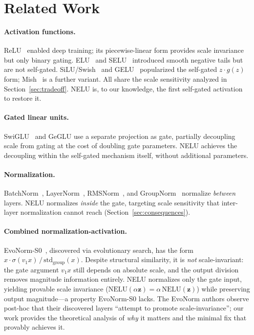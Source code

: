 \section{Related Work}\label{sec:related}

\paragraph{Activation functions.}
ReLU~\citep{nair2010rectified} enabled deep training; its piecewise-linear form provides scale invariance but only binary gating.
ELU~\citep{clevert2016fast} and SELU~\citep{klambauer2017self} introduced smooth negative tails but are not self-gated.
SiLU/Swish~\citep{elfwing2018sigmoid,ramachandran2017searching} and GELU~\citep{hendrycks2016gaussian} popularized the self-gated $z \cdot g(z)$ form; Mish~\citep{misra2019mish} is a further variant.
All share the scale sensitivity analyzed in Section~\ref{sec:tradeoff}.
NELU is, to our knowledge, the first self-gated activation to restore it.

\paragraph{Gated linear units.}
SwiGLU~\citep{shazeer2020glu} and GeGLU use a separate projection as gate, partially decoupling scale from gating at the cost of doubling gate parameters.
NELU achieves the decoupling within the self-gated mechanism itself, without additional parameters.

\paragraph{Normalization.}
BatchNorm~\citep{ioffe2015batch}, LayerNorm~\citep{ba2016layer}, RMSNorm~\citep{zhang2019root}, and GroupNorm~\citep{wu2018group} normalize \emph{between} layers.
NELU normalizes \emph{inside} the gate, targeting scale sensitivity that inter-layer normalization cannot reach (Section~\ref{sec:consequences}).

\paragraph{Combined normalization-activation.}
EvoNorm-S0~\citep{liu2020evolving}, discovered via evolutionary search, has the form $x \cdot \sigma(v_1 x)\,/\,\mathrm{std}_{\mathrm{group}}(x)$.
Despite structural similarity, it is \emph{not} scale-invariant: the gate argument $v_1 x$ still depends on absolute scale, and the output division removes magnitude information entirely.
NELU normalizes only the gate input, yielding provable scale invariance ($\mathrm{NELU}(\alpha\mathbf{z}) = \alpha\,\mathrm{NELU}(\mathbf{z})$) while preserving output magnitude---a property EvoNorm-S0 lacks.
The EvoNorm authors observe post-hoc that their discovered layers ``attempt to promote scale-invariance''; our work provides the theoretical analysis of \emph{why} it matters and the minimal fix that provably achieves it.

